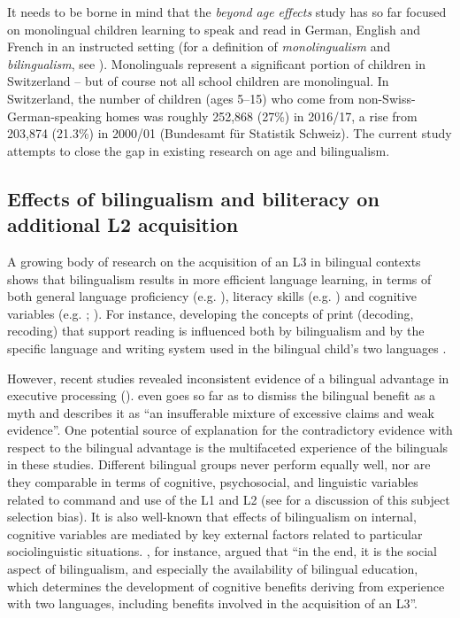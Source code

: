 \documentclass[output=paper,modfonts,nonflat,newtxmath]{langsci/langscibook}
\begin{document}
It needs to be borne in mind that the \textit{beyond age effects} study has so far focused on monolingual children learning to speak and read in German, English and French in an instructed setting (for a definition of \textit{monolingualism} and \textit{bilingualism}, see ). Monolinguals represent a significant portion of children in Switzerland – but of course not all school children are monolingual. In Switzerland, the number of children (ages 5–15) who come from non-Swiss-German-speaking homes was roughly 252,868 (27\%) in 2016/17, a rise from 203,874 (21.3\%) in 2000/01 (Bundesamt für Statistik Schweiz). The current study attempts to close the gap in existing research on age and bilingualism.

\subsection{{Effects} {of} {bilingualism} {and} {biliteracy} {on} {additional} {L2} {acquisition}}
\label{sec:pfenninger:2.2.}

A growing body of research on the acquisition of an L3 in bilingual contexts shows that bilingualism results in more efficient language learning, in terms of both general language proficiency (e.g. \citealt{Lasagabaster2000, Muñoz2000}), literacy skills (e.g. \citealt{KovelmanEtAl2008}) and cognitive variables (e.g. \citealt{Bialystok2007}; \citealt{AdesopeEtAl2010}). For instance, developing the concepts of print (decoding, recoding) that support reading is influenced both by bilingualism and by the specific language and writing system used in the bilingual child’s two languages \citep{BialystokEtAl2005a, KovelmanEtAl2008}.

However, recent studies revealed inconsistent evidence of a bilingual advantage in executive processing (\citealt{PaapGreenberg2013, deBruinEtAl2014, YowLi2015}). \citet[929]{Morton2014} even goes so far as to dismiss the bilingual benefit as a myth and describes it as “an insufferable mixture of excessive claims and weak evidence”. One potential source of explanation for the contradictory evidence with respect to the bilingual advantage is the multifaceted experience of the bilinguals in these studies. Different bilingual groups never perform equally well, nor are they comparable in terms of cognitive, psychosocial, and linguistic variables related to command and use of the L1 and L2 (see \citealt{DeAngelis2015} for a discussion of this subject selection bias). It is also well-known that effects of bilingualism on internal, cognitive variables are mediated by key external factors related to particular sociolinguistic situations. \citet[225]{Sanz2008}, for instance, argued that “in the end, it is the social aspect of bilingualism, and especially the availability of bilingual education, which determines the development of cognitive benefits deriving from experience with two languages, including benefits involved in the acquisition of an L3”.
\end{document}

